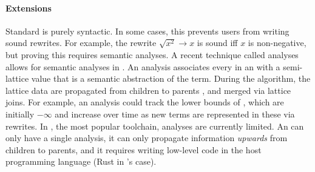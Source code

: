 
\paragraph{Extensions}
Standard \eqsat is purely syntactic.
In some cases, 
 this prevents users from writing sound rewrites.
For example,
 the rewrite $\sqrt{x^2}\rightarrow x$ 
 is sound iff $x$ is non-negative,
 but proving this requires semantic analyses.
A recent technique called \eclass analyses~\cite{egg}
 allows for semantic analyses in \eqsat.
An \eclass analysis associates every \eclass in an \egraph 
 with a semi-lattice value that is a semantic abstraction of the term.
During the \eqsat algorithm,
 the lattice data are propagated
 from children to parents \eclasses, and merged via lattice joins.
For example, 
 an analysis could track the lower bounds of \eclasses,
 which are initially $-\infty$ and increase over time
 as new terms are represented in these \eclasses via rewrites.
In \egg,
 the most popular \eqsat toolchain,
 \eclass analyses are currently limited.
An \egraph can 
 only have a single \eclass analysis,
 it can only propagate information \emph{upwards} from children to parents,
 and it requires writing low-level code in the host programming language (Rust in \egg's case).


